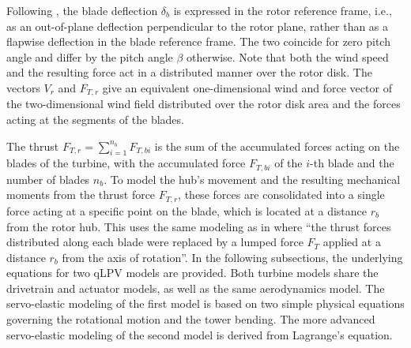 Following \cite{Bianchi2007}, the blade deflection $\delta_b$ is expressed in the rotor reference frame, i.e., as an out-of-plane deflection perpendicular to the rotor plane, rather than as a flapwise deflection in the blade reference frame. The two coincide for zero pitch angle and differ by the pitch angle $\beta$ otherwise. Note that both the wind speed and the resulting force act in a distributed manner over the rotor disk. The vectors $V_r$ and $F_{T,r}$ give an equivalent one-dimensional wind and force vector of the two-dimensional wind field distributed over the rotor disk area and the forces acting at the segments of the blades.

The thrust $F_{T,r} = \sum_{i=1}^{n_b} F_{T,bi}$ is the sum of the accumulated forces acting on the blades of the turbine, with the accumulated force $F_{T,bi}$ of the $i$-th blade and the number of blades $n_b$. To model the hub's movement and the resulting mechanical moments from the thrust force $F_{T,r}$, these forces are consolidated into a single force acting at a specific point on the blade, which is located at a distance $r_b$ from the rotor hub. This uses the same modeling as in \cite{Bianchi2007} where ``the thrust forces distributed along each blade were replaced by a lumped force $F_T$ applied at a distance $r_b$ from the axis of rotation''. 
In the following subsections, the underlying equations for two qLPV models are provided. Both turbine models share the drivetrain and actuator models, as well as the same aerodynamics model. The servo-elastic modeling of the first model is based on two simple physical equations governing the rotational motion and the tower bending. The more advanced servo-elastic modeling of the second model is derived from Lagrange's equation.


